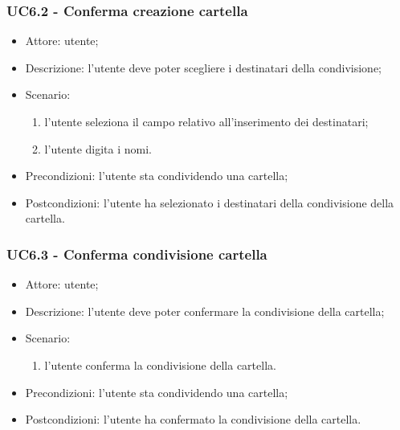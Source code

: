     \subsubsection{UC6.2 - Conferma creazione cartella}
    \begin{itemize}
        \item Attore: utente;
        \item Descrizione: l'utente deve poter scegliere i destinatari della condivisione;
        \item Scenario:
        \begin{enumerate}
            \item l'utente seleziona il campo relativo all'inserimento dei destinatari;
            \item l'utente digita i nomi.
            \end{enumerate}
            \item Precondizioni: l'utente sta condividendo una cartella;
            \item Postcondizioni: l'utente ha selezionato i destinatari della condivisione della cartella.
        \end{itemize}
    
    \subsubsection{UC6.3 - Conferma condivisione cartella}
    \begin{itemize}
        \item Attore: utente;
        \item Descrizione: l'utente deve poter confermare la condivisione della cartella;
        \item Scenario:
        \begin{enumerate}
        \item l'utente conferma la condivisione della cartella.
        \end{enumerate}
        \item Precondizioni: l'utente sta condividendo una cartella;
        \item Postcondizioni: l'utente ha confermato la condivisione della cartella.
    \end{itemize}

